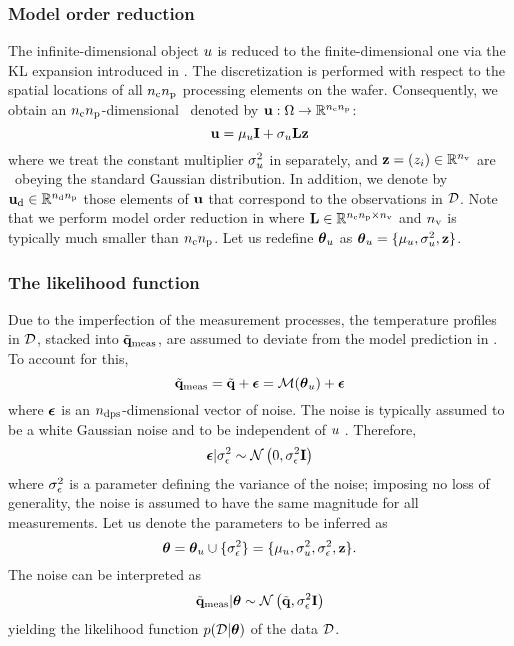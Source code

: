 \subsubsection{Model order reduction} 
The infinite-dimensional object $u$ is reduced to the finite-dimensional one via the KL expansion introduced in . The discretization is performed with respect to the spatial locations of all ${n_{\text{c}}} {n_\text{p}}$ processing elements on the wafer. Consequently, we obtain an ${n_{\text{c}}} {n_\text{p}}$-dimensional \rv\ denoted by $\mathbf{u}: \Omega \to \mathbb{R}^{{n_{\text{c}}} {n_\text{p}}}$:
\begin{equation} \elabel{kl-approximation}
  \vu = \mu_\u \vI + \sigma_\u \mKL \vz
\end{equation}
where we treat the constant multiplier $\sigma^2_u$ in  separately, and $\mathbf{z} = (z_i) \in \mathbb{R}^{n_\text{v}}$ are \rvs\ obeying the standard Gaussian distribution. In addition, we denote by $\mathbf{u}_{\text{d}} \in \mathbb{R}^{{n_{\text{d}}} {n_\text{p}}}$ those elements of $\mathbf{u}$ that correspond to the observations in $\mathcal{D}$. Note that we perform model order reduction in  where $\mathbf{L} \in \mathbb{R}^{{n_{\text{c}}} {n_\text{p}} \times {n_\text{v}}}$ and ${n_\text{v}}$ is typically much smaller than ${n_{\text{c}}} {n_\text{p}}$. Let us redefine ${\boldsymbol\theta}_u$ as ${\boldsymbol\theta}_u = \{ \mu_u, \sigma_u^2, \mathbf{z} \}$.

\subsubsection{The likelihood function}
Due to the imperfection of the measurement processes, the temperature profiles in $\mathcal{D}$, stacked into $\tilde{\mathbf{q}}_{\text{meas}}$, are assumed to deviate from the model prediction in . To account for this,
\[
  \mvT_\meas = \mvT + \vnoise = \model{\vparam_\u} + \vnoise
\]
where $\boldsymbol\epsilon$ is an ${n_\text{dps}}$-dimensional vector of noise. The noise is typically assumed to be a white Gaussian noise and to be independent of $u$ \cite{mackay2003, rasmussen2006, marzouk2009}. Therefore,
\[
  \boldsymbol\epsilon | \sigma^2_\epsilon \sim \mathcal{N}\left( 0, \sigma^2_\epsilon \mathbf{I} \right)
\]
where $\sigma^2_\epsilon$ is a parameter defining the variance of the noise; imposing no loss of generality, the noise is assumed to have the same magnitude for all measurements. Let us denote the parameters to be inferred as
\[
  {\boldsymbol\theta} = {\boldsymbol\theta}_u \cup \{ \sigma_\epsilon^2 \} = \{ \mu_u, \sigma_u^2, \sigma_\epsilon^2, \mathbf{z} \}.
\]
The noise can be interpreted as
\begin{equation} \elabel{likelihood}
  \mvT_\meas | \vparam \sim \gaussian{\mvT}{\sigma_\noise^2 \mI}
\end{equation}
yielding the likelihood function $\f{\Data | \vparam}$ of the data $\mathcal{D}$.

